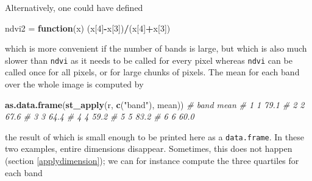 \documentclass[]{book}
\newenvironment{Shaded}{\begin{snugshade}}{\end{snugshade}}
\newcommand{\CommentTok}[1]{\textcolor[rgb]{0.56,0.35,0.01}{\textit{#1}}}
\newcommand{\ControlFlowTok}[1]{\textcolor[rgb]{0.13,0.29,0.53}{\textbf{#1}}}
\newcommand{\DecValTok}[1]{\textcolor[rgb]{0.00,0.00,0.81}{#1}}
\newcommand{\FloatTok}[1]{\textcolor[rgb]{0.00,0.00,0.81}{#1}}
\newcommand{\KeywordTok}[1]{\textcolor[rgb]{0.13,0.29,0.53}{\textbf{#1}}}
\newcommand{\NormalTok}[1]{#1}
\newcommand{\OperatorTok}[1]{\textcolor[rgb]{0.81,0.36,0.00}{\textbf{#1}}}
\newcommand{\StringTok}[1]{\textcolor[rgb]{0.31,0.60,0.02}{#1}}
\begin{document}
Alternatively, one could have defined

\begin{Shaded}
\begin{Highlighting}[]
\NormalTok{ndvi2 =}\StringTok{ }\ControlFlowTok{function}\NormalTok{(x) (x[}\DecValTok{4}\NormalTok{]}\OperatorTok{-}\NormalTok{x[}\DecValTok{3}\NormalTok{])}\OperatorTok{/}\NormalTok{(x[}\DecValTok{4}\NormalTok{]}\OperatorTok{+}\NormalTok{x[}\DecValTok{3}\NormalTok{])}
\end{Highlighting}
\end{Shaded}

which is more convenient if the number of bands is large,
but which is also much slower than \texttt{ndvi} as it
needs to be called for every pixel whereas \texttt{ndvi} can be called
once for all pixels, or for large chunks of pixels.
The mean for each band over the whole image is computed by

\begin{Shaded}
\begin{Highlighting}[]
\KeywordTok{as.data.frame}\NormalTok{(}\KeywordTok{st_apply}\NormalTok{(r, }\KeywordTok{c}\NormalTok{(}\StringTok{"band"}\NormalTok{), mean))}
\CommentTok{#   band mean}
\CommentTok{# 1    1 79.1}
\CommentTok{# 2    2 67.6}
\CommentTok{# 3    3 64.4}
\CommentTok{# 4    4 59.2}
\CommentTok{# 5    5 83.2}
\CommentTok{# 6    6 60.0}
\end{Highlighting}
\end{Shaded}

the result of which is small enough to be printed here as a \texttt{data.frame}. In these
two examples, entire dimensions disappear. Sometimes, this does not
happen (section \ref{applydimension}); we can for instance compute the three quartiles for each band

\begin{Shaded}
\end{Shaded}
\end{document}

